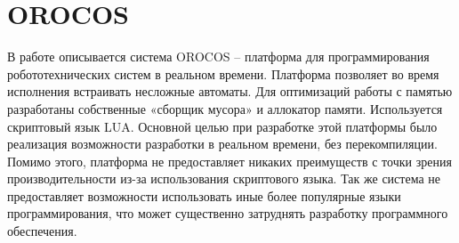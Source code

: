 \section{OROCOS}

В работе \cite{klotzbucher2010orocos}  описывается система OROCOS – платформа для программирования робототехнических систем в реальном времени. Платформа позволяет во время исполнения встраивать несложные автоматы. Для оптимизаций работы с памятью разработаны собственные «сборщик мусора» и аллокатор памяти. Используется скриптовый язык LUA. Основной целью при разработке этой платформы было реализация возможности разработки в реальном времени, без перекомпиляции. Помимо этого, платформа не предоставляет никаких преимуществ с точки зрения производительности из-за использования скриптового языка. Так же система не предоставляет возможности использовать иные более популярные языки программирования, что может существенно затруднять разработку программного обеспечения.